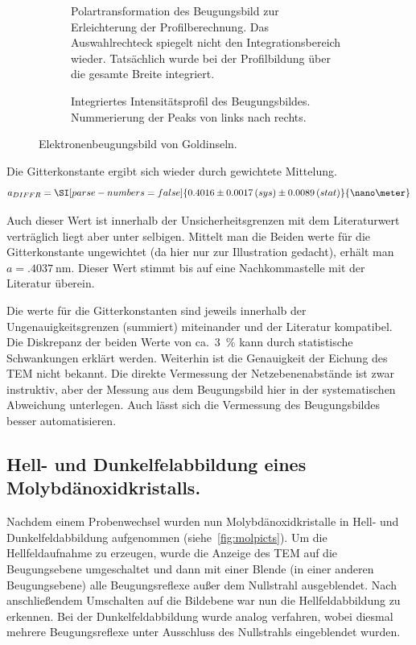 \documentclass[slug=TEM, room=IFW, supervisor=?, coursedate=23.\ 01.\ 2020]{../../Lab_Report_LaTeX/lab_report}
\begin{document}
\begin{figure}[hp]
\begin{subfigure}{.4\textwidth}
    \caption{Polartransformation des Beugungsbild zur Erleichterung
      der Profilberechnung. Das Auswahlrechteck spiegelt nicht den
      Integrationsbereich wieder. Tats\"achlich wurde bei der
      Profilbildung \"uber die gesamte Breite integriert.}%
    \label{fig:ebeug_polar}
  \end{subfigure}
  \begin{subfigure}{\textwidth}
    \centering \resizebox{1\textwidth}{!}{%
      }
    \caption{Integriertes Intensit\"atsprofil des
      Beugungsbildes. Nummerierung der Peaks von links nach rechts.}%
    \label{fig:gold_diffr-profile}
  \end{subfigure}
  \caption{Elektronenbeugungsbild von Goldinseln.}
  \label{fig:ebeug}
\end{figure}

Die Gitterkonstante ergibt sich wieder durch gewichtete Mittelung.
\begin{equation}
  \label{eq:ahrtem}
  a_{DIFFR} = \SI[parse-numbers=false]{0.4016\pm 0.0017\,(sys)\pm 0.0089\,(stat)}{\nano\meter}
\end{equation}

Auch dieser Wert ist innerhalb der Unsicherheitsgrenzen mit dem
Literaturwert vertr\"aglich liegt aber unter selbigen. Mittelt man die
Beiden werte f\"ur die Gitterkonstante ungewichtet (da hier nur zur
Illustration gedacht), erhält man
\(a=\SI{.4037}{\nano\meter}\). Dieser Wert stimmt bis auf eine
Nachkommastelle mit der Literatur \"uberein.

Die werte f\"ur die Gitterkonstanten sind jeweils innerhalb der
Ungenauigkeitsgrenzen (summiert) miteinander und der Literatur
kompatibel. Die Diskrepanz der beiden Werte von ca.~\SI{3}{\percent}
kann durch statistische Schwankungen erkl\"art werden. Weiterhin ist
die Genauigkeit der Eichung des TEM nicht bekannt. Die direkte
Vermessung der Netzebenenabst\"ande ist zwar instruktiv, aber der
Messung aus dem Beugungsbild hier in der systematischen Abweichung
unterlegen. Auch l\"asst sich die Vermessung des Beugungsbildes besser
automatisieren.

\subsection{Hell- und Dunkelfelabbildung eines Molybd\"anoxidkristalls.}
\label{sec:molyb}
Nachdem einem Probenwechsel wurden nun Molybd\"anoxidkristalle in
Hell- und Dunkelfeldabbildung aufgenommen (siehe~\ref{fig:molpicts}).
Um die Hellfeldaufnahme zu erzeugen, wurde die Anzeige des TEM auf die
Beugungsebene umgeschaltet und dann mit einer Blende (in einer anderen
Beugungsebene) alle Beugungsreflexe außer dem Nullstrahl
ausgeblendet. Nach anschlie\ss{}endem Umschalten auf die Bildebene war
nun die Hellfeldabbildung zu erkennen. Bei der Dunkelfeldabbildung
wurde analog verfahren, wobei diesmal mehrere Beugungsreflexe unter
Ausschluss des Nullstrahls eingeblendet wurden.
\end{document}
